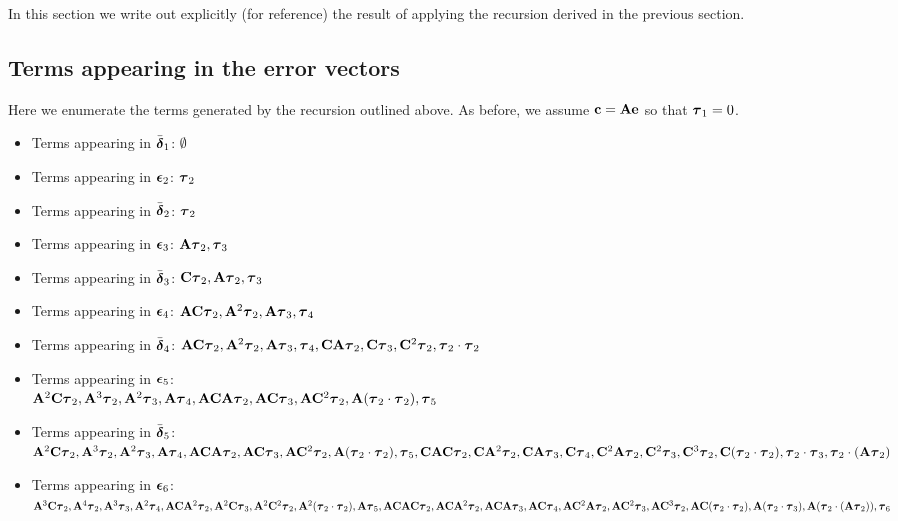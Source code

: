 In this section we write out explicitly (for reference) the result of applying
the recursion derived in the previous section.

\subsection{Terms appearing in the error vectors}
Here we enumerate the terms generated by the recursion outlined above.
As before, we assume $\bc=\mA\bfe$ so that $\ste_1=0$.  
\begin{itemize}
  \item Terms appearing in $\deltaset_1$: $\emptyset$
  \item Terms appearing in $\gserr_2$: $\ste_2$
  \item Terms appearing in $\deltaset_2$: $\ste_2$
  \item Terms appearing in $\gserr_3$: $\mA\ste_2,\ste_3$
  \item Terms appearing in $\deltaset_3$: $\mC\ste_2, \mA\ste_2, \ste_3$
  \item Terms appearing in $\gserr_4$: $\mA \mC\ste_2, \mA^2\ste_2, \mA\ste_3,\ste_4$
  \item Terms appearing in $\deltaset_4$: $\mA \mC\ste_2, \mA^2\ste_2, \mA\ste_3,\ste_4, \mC\mA\ste_2, \mC\ste_3, \mC^2\ste_2, \ste_2\cdot\ste_2$

  \item Terms appearing in $\gserr_5$: \\ $\mA^2 \mC\ste_2, \mA^3\ste_2, \mA^2\ste_3,\mA\ste_4, \mA \mC\mA\ste_2, \mA \mC\ste_3, \mA \mC^2\ste_2, \mA (\ste_2\cdot\ste_2), \ste_5$

  \item Terms appearing in $\deltaset_5$: \\ $\mA^2 \mC\ste_2, \mA^3\ste_2, \mA^2\ste_3,\mA\ste_4, \mA \mC\mA\ste_2, \mA \mC\ste_3, \mA \mC^2\ste_2, \mA (\ste_2\cdot\ste_2), \ste_5, \\
  \mC \mA \mC\ste_2, \mC \mA^2\ste_2, \mC \mA\ste_3,\mC \ste_4, \\
  \mC^2 \mA \ste_2, \mC^2 \ste_3, \mC^3 \ste_2,
  \mC(\ste_2\cdot\ste_2), \ste_2\cdot\ste_3, \ste_2\cdot(\mA\ste_2)$

  \item Terms appearing in $\gserr_6$: \\ $\mA^3 \mC\ste_2, \mA^4\ste_2, \mA^3\ste_3,\mA^2\ste_4, \mA \mC\mA^2\ste_2, \mA^2 \mC\ste_3, \mA^2 \mC^2\ste_2, \mA^2 (\ste_2\cdot\ste_2), \mA \ste_5, \\
  \mA \mC \mA \mC\ste_2, \mA \mC \mA^2\ste_2, \mA \mC \mA\ste_3,\mA \mC \ste_4, \\
  \mA \mC^2 \mA \ste_2, \mA \mC^2 \ste_3, \mA \mC^3 \ste_2,
  \mA \mC(\ste_2\cdot\ste_2), \mA (\ste_2\cdot\ste_3), \mA (\ste_2\cdot(\mA\ste_2)), \ste_6$


\end{itemize}

